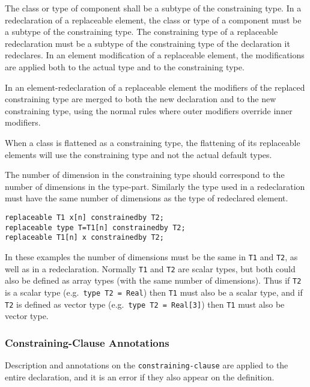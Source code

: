 The class or type of component shall be a subtype of the constraining
type. In a redeclaration of a replaceable element, the class or type of
a component must be a subtype of the constraining type. The constraining
type of a replaceable redeclaration must be a subtype of the
constraining type of the declaration it redeclares. In an element
modification of a replaceable element, the modifications are applied
both to the actual type and to the constraining type.

In an element-redeclaration of a replaceable element the modifiers of
the replaced constraining type are merged to both the new declaration
and to the new constraining type, using the normal rules where outer
modifiers override inner modifiers.

When a class is flattened as a constraining type, the flattening of its
replaceable elements will use the constraining type and not the actual
default types.

The number of dimension in the constraining type should correspond to
the number of dimensions in the type-part. Similarly the type used in a
redeclaration must have the same number of dimensions as the type of
redeclared element.

\begin{example}
\begin{lstlisting}[language=modelica]
replaceable T1 x[n] constrainedby T2;
replaceable type T=T1[n] constrainedby T2;
replaceable T1[n] x constrainedby T2;
\end{lstlisting}
In these examples the number of dimensions must be the same in \lstinline!T1! and \lstinline!T2!, as well as in a redeclaration.  Normally \lstinline!T1! and \lstinline!T2! are scalar types, but both
could also be defined as array types (with the same number of dimensions).  Thus if \lstinline!T2! is a scalar type (e.g.\ \lstinline!type T2 = Real!) then \lstinline!T1! must also be a scalar type,
and if \lstinline!T2! is defined as vector type (e.g.\ \lstinline!type T2 = Real[3]!) then \lstinline!T1! must also be vector type.
\end{example}

\subsubsection{Constraining-Clause Annotations}\label{constraining-clause-annotations}

Description and annotations on the \lstinline[language=grammar]!constraining-clause! are applied to the entire declaration, and it is an error if they also appear on the definition.

